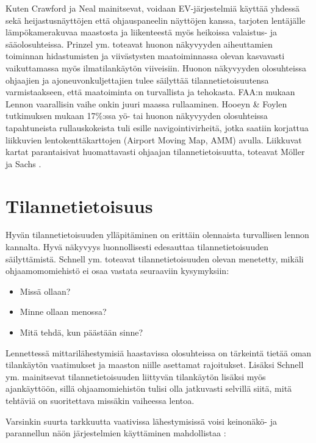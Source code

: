 \documentclass[utf8,bachelor,manualbib]{gradu3}
\begin{document}
Kuten Crawford ja Neal \citeyearpar{crawfordneal2006} mainitsevat, voidaan EV-järjestelmiä käyttää yhdessä sekä heijastusnäyttöjen että ohjauspaneelin näyttöjen kanssa, tarjoten lentäjälle lämpökamerakuvaa maastosta ja liikenteestä myös heikoissa valaistus- ja sääolosuhteissa. Prinzel ym. \citeyearpar{prinzel2013} toteavat huonon näkyvyyden aiheuttamien toiminnan hidastumisten ja viivästysten maatoiminnassa olevan kasvavasti vaikuttamassa myös ilmatilankäytön viiveisiin. Huonon näkyvyyden olosuhteissa ohjaajien ja ajoneuvonkuljettajien tulee säilyttää tilannetietoisuutensa varmistaakseen, että maatoiminta on turvallista ja tehokasta. FAA:n mukaan \citeyearpar{gerold2001} Lennon vaarallisin vaihe onkin juuri maassa rullaaminen. Hooeyn \& Foylen \citeyearpar{hooey2007} tutkimuksen mukaan 17\%:ssa yö- tai huonon näkyvyyden olosuhteissa tapahtuneista rullauskokeista tuli esille navigointivirheitä, jotka saatiin korjattua liikkuvien lentokenttäkarttojen (Airport Moving Map, AMM) avulla. Liikkuvat kartat parantaisivat huomattavasti ohjaajan tilannetietoisuutta, toteavat Möller ja Sachs \citeyearpar{mollersachs1994}.

\section{Tilannetietoisuus}

Hyvän tilannetietoisuuden ylläpitäminen on erittäin olennaista turvallisen lennon kannalta. Hyvä näkyvyys luonnollisesti edesauttaa tilannetietoisuuden säilyttämistä. Schnell ym. \citeyearpar{schnellym2004} toteavat tilannetietoisuuden olevan menetetty, mikäli ohjaamomomiehistö ei osaa vastata seuraaviin kysymyksiin:

\begin{itemize}
\item Missä ollaan?
\item Minne ollaan menossa?
\item Mitä tehdä, kun päästään sinne?
\end{itemize}

Lennettessä mittarilähestymisiä haastavissa olosuhteissa on tärkeintä tietää oman tilankäytön vaatimukset ja maaston niille asettamat rajoitukset. Lisäksi Schnell ym. \citeyearpar{schnellym2004} mainitsevat tilannetietoisuuden liittyvän tilankäytön lisäksi myös ajankäyttöön, sillä ohjaamomiehistön tulisi olla jatkuvasti selvillä siitä, mitä tehtäviä on suoritettava missäkin vaiheessa lentoa. 

Varsinkin suurta tarkkuutta vaativissa lähestymisissä voisi keinonäkö- ja parannellun näön järjestelmien käyttäminen mahdollistaa \citep{schnellym2004}:
\end{document}
